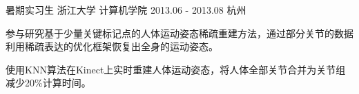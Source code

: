 \begin{cventries}
  \cventry
    {暑期实习生}
    {浙江大学 \quad 计算机学院}
    {2013.06 - 2013.08}
    {杭州}
    {
      \begin{cvitems}
        \item {参与研究基于少量关键标记点的人体运动姿态稀疏重建方法，通过部分关节的数据利用稀疏表达的优化框架恢复出全身的运动姿态。}
        \item {使用KNN算法在Kinect上实时重建人体运动姿态，将人体全部关节合并为关节组减少20\%计算时间。}
      \end{cvitems}
    }
\end{cventries}
